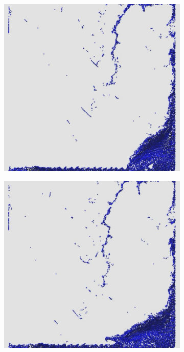 \documentclass[12pt,a4paper,dvipsnames]{article}
\begin{document}
\begin{figure}[!ht]
\begin{subfigure}[!h]{0.3\textwidth}
	\end{subfigure}
	\begin{subfigure}[!h]{0.3\textwidth} \centering
		\includegraphics[width=\textwidth]{DB/DB-008.jpg}
	\end{subfigure}
	\begin{subfigure}[!h]{0.3\textwidth} \centering
		\includegraphics[width=\textwidth]{DB/DB-009.jpg}

\end{subfigure}
\end{figure}
\end{document}
